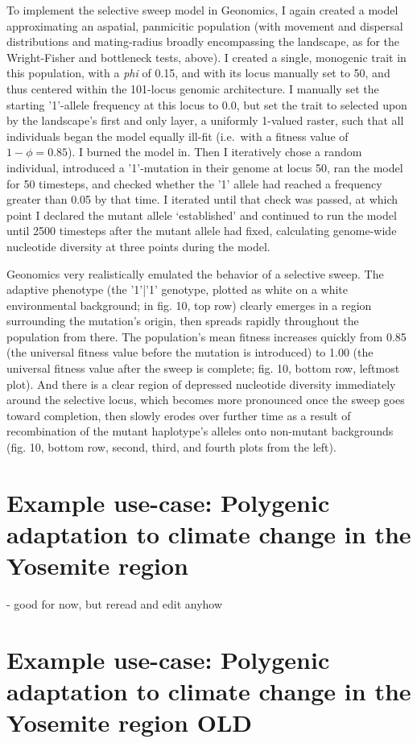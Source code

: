 ﻿\documentclass{article}
\begin{document}
To implement the selective sweep model in Geonomics, I again created a model
approximating an aspatial, panmicitic population (with movement and dispersal
distributions and mating-radius broadly encompassing the landscape, as for
the Wright-Fisher and bottleneck tests, above).
I created a single, monogenic trait in this population, with a \emph{phi} of
0.15, and with its locus manually set to 50, and thus centered
within the 101-locus genomic architecture. I manually set the starting 
'1'-allele frequency at this locus to 0.0, but set the trait to selected upon
by the landscape's first and only layer, a uniformly 1-valued raster, such
that all individuals began the model equally ill-fit (i.e.\ with a fitness value of
$1 - \phi = 0.85$). I burned the model in. Then I iteratively chose a random individual,
introduced a '1'-mutation in their genome at locus 50, ran the model for 50 timesteps,
and checked whether the '1' allele had reached a frequency greater than 0.05 by that
time. I iterated until that check was passed, at which point I declared
the mutant allele `established' and continued to run the model until 2500 timesteps
after the mutant allele had fixed, calculating genome-wide nucleotide diversity
at three points during the model.

Geonomics very realistically emulated the behavior of a selective sweep. The
adaptive phenotype (the '1'|'1' genotype, plotted as white
on a white environmental background; in fig. 10, top row) clearly
emerges in a region surrounding the mutation's origin, then spreads rapidly
throughout the population from there. The population's mean fitness increases
quickly from 0.85 (the universal fitness value before the mutation is
introduced) to 1.00 (the universal fitness value after the sweep is complete;
fig. 10, bottom row, leftmost plot). And there is a clear region of depressed
nucleotide diversity immediately around the selective locus, which becomes
more pronounced once the sweep goes toward completion, then slowly erodes
over further time as a result of recombination of the mutant haplotype's
alleles onto non-mutant backgrounds (fig. 10, bottom row, second, third, and
fourth plots from the left).

\section{Example use-case: Polygenic adaptation to climate change in the Yosemite region}
- good for now, but reread and edit anyhow


\section{Example use-case: Polygenic adaptation to climate change in the Yosemite region OLD}
\end{document}

